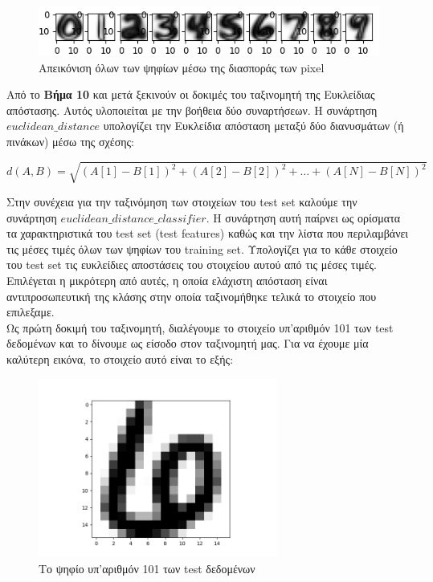 \documentclass[11pt]{article} %
\begin{document}
\begin{figure}[H]
    \centering
    \includegraphics[width=1.1\textwidth]{plots/all_digits_variance}
    \caption{Απεικόνιση όλων των ψηφίων μέσω της διασποράς των pixel}
    \label{fig:all_mean}
\end{figure}


Από το \textbf{Βήμα 10} και μετά ξεκινούν οι δοκιμές του ταξινομητή της Ευκλείδιας απόστασης. Αυτός υλοποιείται με την βοήθεια δύο συναρτήσεων. Η συνάρτηση $euclidean\_distance$ υπολογίζει την Ευκλείδια απόσταση μεταξύ δύο διανυσμάτων (ή πινάκων) μέσω της σχέσης:

\begin{equation}
\displaystyle d(A, B) = \sqrt{(A[1] -B[1]) ^ 2 + (A[2] - B[2]) ^ 2 + \dots + (A[N] - B[N]) ^ 2}
\end{equation}

Στην συνέχεια για την ταξινόμηση των στοιχείων του test set καλούμε την συνάρτηση $euclidean\_distance\_classifier$. Η συνάρτηση αυτή παίρνει ως ορίσματα τα χαρακτηριστικά του test set (test features) καθώς και την λίστα που περιλαμβάνει τις μέσες τιμές όλων των ψηφίων του training set. Υπολογίζει για το κάθε στοιχείο του test set τις ευκλείδιες αποστάσεις του στοιχείου αυτού από τις μέσες τιμές. Επιλέγεται η μικρότερη από αυτές, η οποία ελάχιστη απόσταση είναι αντιπροσωπευτική της κλάσης στην οποία ταξινομήθηκε τελικά το στοιχείο που επιλεξαμε.\\

Ως πρώτη δοκιμή του ταξινομητή, διαλέγουμε το στοιχείο υπ'αριθμόν 101 των test δεδομένων και το δίνουμε ως είσοδο στον ταξινομητή μας. Για να έχουμε μία καλύτερη εικόνα, το στοιχείο αυτό είναι το εξής:


\begin{figure}[H]
    \centering
    \includegraphics[width=0.7\textwidth]{plots/figure_101}
    \caption{Το ψηφίο υπ'αριθμόν 101 των test δεδομένων}
    \label{fig:101}
\end{figure}
\end{document}
